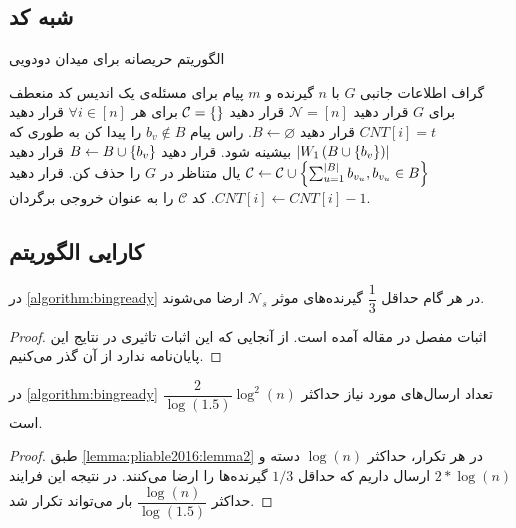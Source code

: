\subsection{شبه کد}
	\begin{algorithm}[H]
	\caption[
	الگوریتم حریصانه برای میدان دودویی
	]{
		الگوریتم حریصانه برای میدان دودویی
		\cite{pliable2016}
		}
	\label{algorithm:bingready}
	\begin{algorithmic}[1]
		\Require
		 گراف اطلاعات جانبی
		$G$
		با 
		$n$
		گیرنده و
		$m$
		پیام برای مسئله‌ی
		\Ensure
		یک اندیس کد منعطف برای
		$G$
		\State 
		قرار دهید
		 $\mathcal{N} = [n]$
		\State
		قرار دهید
		 $\mathcal{C} = \left\{  \right\}$
		\State
		برای هر
		 $\forall i \in [n]$
		 قرار دهید
		 $CNT[i] = t$ 
		\State قرار دهید
		$B \leftarrow \varnothing$.
		\State
		راس پیام
		 $b_v \notin B$
		 را پیدا کن به طوری که
		 $\left|{W_1\left(B \cup\left\{ b_v \right\}\right)}\right|$
		 بیشینه شود.
		\State قرار دهید
		$B \leftarrow B \cup\left\{ b_v \right\}$
		\EndWhile
		\State قرار دهید
		 $\mathcal{C} \leftarrow \mathcal{C} \cup\left\{ \sum_{u=1}^{\left|{B}\right|} b_{v_u}, b_{v_u} \in B \right\}$
		\State
		یال متناظر در
		 $G$
		 را حذف کن.
		\EndIf
		\State
		قرار دهید
		 $CNT[i] \leftarrow CNT[i]-1$.
		\EndFor
		\EndWhile
		\State کد
		 $\mathcal{C}$
		 را به عنوان خروجی برگردان.
	\end{algorithmic}
\end{algorithm}


\subsection{
کارایی الگوریتم
}
\begin{lemma}
	\label{lemma:pliable2016:lemma2}
	در 
	\autoref{algorithm:bingready}
	در هر گام حداقل 
	$\dfrac{1}{3}$
	گیرنده‌های موثر
	$\mathcal{N}_s$
	ارضا می‌شوند.
\end{lemma}
\begin{proof}
	اثبات مفصل در مقاله آمده است. از آنجایی که این اثبات تاثیری در نتایج این پایان‌نامه ندارد از آن گذر می‌کنیم.
\end{proof}

\begin{theorem}
	\label{theorem:pliable2016:theorem1}
	در 
		\autoref{algorithm:bingready}
		تعداد ارسال‌های مورد نیاز حداکثر
		$\dfrac{2}{\log(1.5)} \log^2(n)$
		است.
\end{theorem}
\begin{proof}
	 طبق
	 \autoref{lemma:pliable2016:lemma2}
	 در هر تکرار، حداکثر
	 $\log(n)$
	 دسته و
	 $2 * \log(n)$
	 ارسال داریم که حداقل
	 $1/3$
	 گیرنده‌ها را ارضا می‌کنند. در نتیجه این فرایند حداکثر
	 $\dfrac{\log(n)}{\log(1.5)}$
	 بار می‌تواند تکرار شد.
\end{proof}


